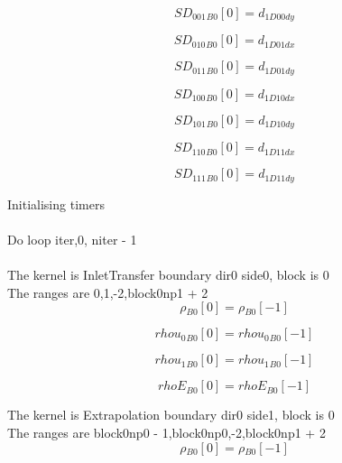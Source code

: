 \documentclass{article}
\begin{document}
\begin{dmath}{SD_{001}{_{B0}}}[{0}] = d_{1 D00 dy}\end{dmath}

\begin{dmath}{SD_{010}{_{B0}}}[{0}] = d_{1 D01 dx}\end{dmath}

\begin{dmath}{SD_{011}{_{B0}}}[{0}] = d_{1 D01 dy}\end{dmath}

\begin{dmath}{SD_{100}{_{B0}}}[{0}] = d_{1 D10 dx}\end{dmath}

\begin{dmath}{SD_{101}{_{B0}}}[{0}] = d_{1 D10 dy}\end{dmath}

\begin{dmath}{SD_{110}{_{B0}}}[{0}] = d_{1 D11 dx}\end{dmath}

\begin{dmath}{SD_{111}{_{B0}}}[{0}] = d_{1 D11 dy}\end{dmath}

\noindent Initialising timers\\
\\\noindent Do loop iter,0, niter - 1\\
\\\noindent The kernel is InletTransfer boundary dir0 side0, block is 0\\\noindent The ranges are 0,1,-2,block0np1 + 2\\\begin{dmath}{\rho{_{B0}}}[{0}] = {\rho{_{B0}}}[{-1}]\end{dmath}

\begin{dmath}{rhou_{0}{_{B0}}}[{0}] = {rhou_{0}{_{B0}}}[{-1}]\end{dmath}

\begin{dmath}{rhou_{1}{_{B0}}}[{0}] = {rhou_{1}{_{B0}}}[{-1}]\end{dmath}

\begin{dmath}{rhoE{_{B0}}}[{0}] = {rhoE{_{B0}}}[{-1}]\end{dmath}

\noindent The kernel is Extrapolation boundary dir0 side1, block is 0\\\noindent The ranges are block0np0 - 1,block0np0,-2,block0np1 + 2\\\begin{dmath}{\rho{_{B0}}}[{0}] = {\rho{_{B0}}}[{-1}]\end{dmath}
\end{document}
